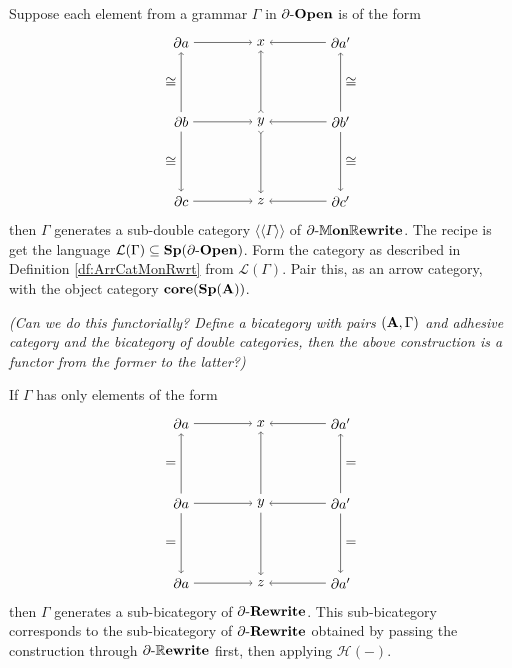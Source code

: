 \documentclass{amsart}
\begin{document}
\begin{thm}
	Suppose each element from a grammar $ \Gamma $ in $ \partial \text{-} \mathbf{Open} $ is of the form 
	\[
	\begin{tikzpicture}
	\node (a) at (-1,1) {$ \partial a $};
	\node (x) at (1,1) {$ x $};
	\node (a') at (3,1) {$ \partial a' $};
	\node (b) at (-1,-1) {$ \partial b $};
	\node (y) at (1,-1) {$ y $};
	\node (b') at (3,-1) {$ \partial b' $};
	\node (c) at (-1,-3) {$ \partial c $};
	\node (z) at (1,-3) {$ z $};
	\node (c') at (3,-3) {$ \partial c' $};
	\draw [->] (a) to (x);
	\draw [->] (a') to (x);
	\draw [->] (b) to (y);
	\draw [->] (b') to (y);
	\draw [->] (c) to (z);
	\draw [->] (c') to (z);
	\draw [->] (b) to node [left] {$ \cong $} (a);
	\draw [->] (b) to node [left] {$ \cong $} (c);
	\draw [>->] (y) to (x);
	\draw [>->] (y) to (z);
	\draw [->] (b') to node [right] {$ \cong $} (a');
	\draw [->] (b') to node [right] {$ \cong $} (c');
	\end{tikzpicture}
	\]
	then $ \Gamma $ generates a sub-double category $ \langle \langle \Gamma \rangle \rangle $ of $ \partial \text{-} \mathbb{M}\mathbf{on}\mathbb{R}\mathbf{ewrite} $.  The recipe is get the language $ \mathcal{L}(\Gamma)  \subseteq \mathbf{Sp}(\partial \text{-} \mathbf{Open}) $. Form the category as described in Definition \ref{df:ArrCatMonRwrt} from $ \mathcal{L}(\Gamma) $. Pair this, as an arrow category, with the object category $ \mathbf{core}(\mathbf{Sp}(\mathbf{A})) $.
\end{thm}

{\color{red}\emph{(Can we do this functorially? Define a bicategory with pairs $ (\mathbf{A} , \Gamma) $ and adhesive category and the bicategory of double categories, then the above construction is a functor from the former to the latter?)}}

\begin{thm}
	If $ \Gamma $ has only elements of the form 
	\[
	\begin{tikzpicture}
		\node (a) at (-1,1) {$ \partial a $};
		\node (x) at (1,1) {$ x $};
		\node (a') at (3,1) {$ \partial a' $};
		\node (b) at (-1,-1) {$ \partial a $};
		\node (y) at (1,-1) {$ y $};
		\node (b') at (3,-1) {$ \partial a' $};
		\node (c) at (-1,-3) {$ \partial a $};
		\node (z) at (1,-3) {$ z $};
		\node (c') at (3,-3) {$ \partial a' $};
		\draw [->] (a) to (x);
		\draw [->] (a') to (x);
		\draw [->] (b) to (y);
		\draw [->] (b') to (y);
		\draw [->] (c) to (z);
		\draw [->] (c') to (z);
		\draw [->] (b) to node [left] {$ = $} (a);
		\draw [->] (b) to node [left] {$ = $} (c);
		\draw [->] (y) to (x);
		\draw [->] (y) to (z);
		\draw [->] (b') to node [right] {$ = $} (a');
		\draw [->] (b') to node [right] {$ = $} (c');
	\end{tikzpicture}
	\]
	then $ \Gamma $ generates a sub-bicategory of $ \partial \text{-} \mathbf{Rewrite} $.  This sub-bicategory corresponds to the sub-bicategory of $ \partial \text{-} \mathbf{Rewrite} $ obtained by passing the construction through $ \partial \text{-} \mathbb{R}\mathbf{ewrite} $ first, then applying $ \mathcal{H}(-) $.  
\end{thm}
\end{document}
